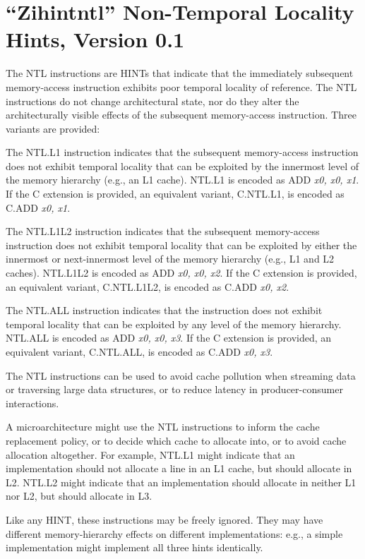 \chapter{``Zihintntl'' Non-Temporal Locality Hints, Version 0.1}
\label{chap:zihintpause}

The NTL instructions are HINTs that indicate that the immediately subsequent
memory-access instruction exhibits poor temporal locality of reference.
The NTL instructions do not change architectural state, nor do they alter the
architecturally visible effects of the subsequent memory-access instruction.
Three variants are provided:

The NTL.L1 instruction indicates that the subsequent memory-access
instruction does not exhibit temporal locality that can be exploited by the
innermost level of the memory hierarchy (e.g., an L1 cache).
NTL.L1 is encoded as ADD {\em x0, x0, x1}.
If the C extension is provided, an equivalent variant, C.NTL.L1, is encoded
as C.ADD {\em x0, x1}.

The NTL.L1L2 instruction indicates that the subsequent memory-access
instruction does not exhibit temporal locality that can be exploited by either
the innermost or next-innermost level of the memory hierarchy (e.g., L1 and L2
caches).
NTL.L1L2 is encoded as ADD {\em x0, x0, x2}.
If the C extension is provided, an equivalent variant, C.NTL.L1L2, is encoded
as C.ADD {\em x0, x2}.

The NTL.ALL instruction indicates that the instruction does not exhibit
temporal locality that can be exploited by any level of the memory hierarchy.
NTL.ALL is encoded as ADD {\em x0, x0, x3}.
If the C extension is provided, an equivalent variant, C.NTL.ALL, is encoded
as C.ADD {\em x0, x3}.

\begin{commentary}
The NTL instructions can be used to avoid cache pollution when streaming data
or traversing large data structures, or to reduce latency in producer-consumer
interactions.

A microarchitecture might use the NTL instructions to inform the cache
replacement policy, or to decide which cache to allocate into, or to avoid
cache allocation altogether.
For example, NTL.L1 might indicate that an implementation should not allocate
a line in an L1 cache, but should allocate in L2.
NTL.L2 might indicate that an implementation should allocate in neither L1
nor L2, but should allocate in L3.

Like any HINT, these instructions may be freely ignored.
They may have different memory-hierarchy effects on different implementations:
e.g., a simple implementation might implement all three hints identically.
\end{commentary}

